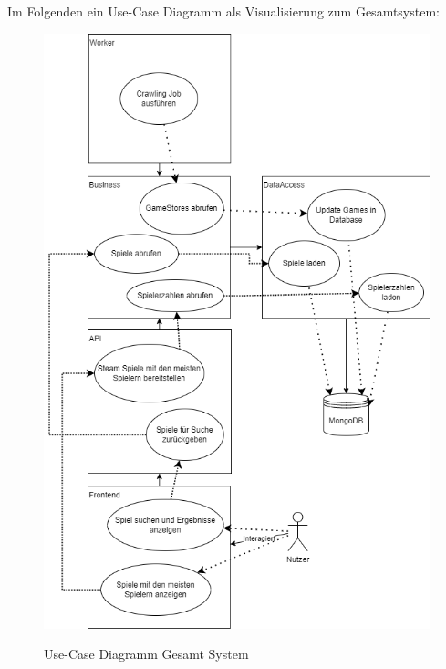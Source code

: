 Im Folgenden ein Use-Case Diagramm als Visualisierung zum Gesamtsystem:

\begin{figure}[hbt!]
    \begin{minipage}[t]{.8\textwidth} %
        \caption{Use-Case Diagramm Gesamt System} %
        \includegraphics[width=1\textwidth]{img/use_case_gesamt_system.png}\\ %
    \end{minipage}
\end{figure}

\newpage
